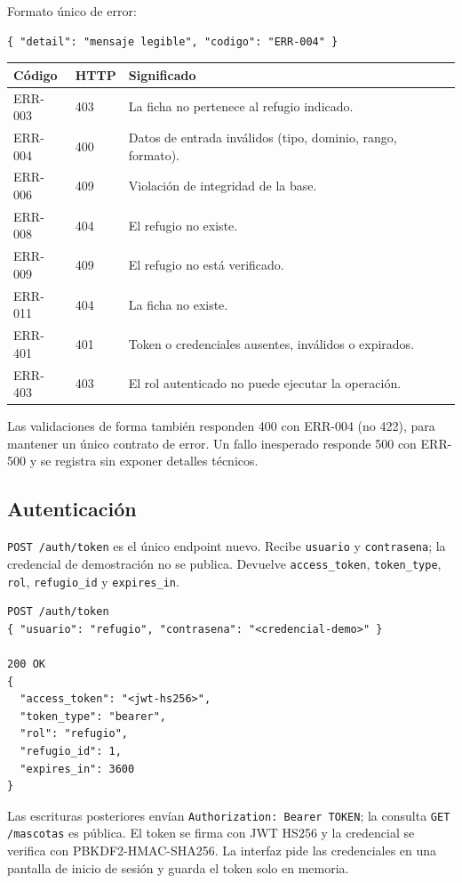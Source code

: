 \documentclass[11pt,a4paper]{article}
\newcommand{\code}[1]{\texttt{#1}}
\newcommand{\thead}[1]{\textbf{#1}}
\begin{document}
Formato único de error:

\begin{lstlisting}
{ "detail": "mensaje legible", "codigo": "ERR-004" }
\end{lstlisting}

{\footnotesize
\begin{tabularx}{\linewidth}{@{}V{0.5}V{0.5}V{2.0}@{}}
\toprule
\thead{Código} & \thead{HTTP} & \thead{Significado} \\ \midrule
ERR-003 & 403 & La ficha no pertenece al refugio indicado. \\
ERR-004 & 400 & Datos de entrada inválidos (tipo, dominio, rango, formato). \\
ERR-006 & 409 & Violación de integridad de la base. \\
ERR-008 & 404 & El refugio no existe. \\
ERR-009 & 409 & El refugio no está verificado. \\
ERR-011 & 404 & La ficha no existe. \\
ERR-401 & 401 & Token o credenciales ausentes, inválidos o expirados. \\
ERR-403 & 403 & El rol autenticado no puede ejecutar la operación. \\
\bottomrule
\end{tabularx}
}

Las validaciones de forma también responden 400 con ERR-004 (no 422), para
mantener un único contrato de error. Un fallo inesperado responde 500 con
ERR-500 y se registra sin exponer detalles técnicos.

\subsection{Autenticación}

\code{POST /auth/token} es el único endpoint nuevo. Recibe \code{usuario} y
\code{contrasena}; la credencial de demostración no se publica. Devuelve
\code{access\_token}, \code{token\_type}, \code{rol},
\code{refugio\_id} y \code{expires\_in}.

\begin{lstlisting}
POST /auth/token
{ "usuario": "refugio", "contrasena": "<credencial-demo>" }

200 OK
{
  "access_token": "<jwt-hs256>",
  "token_type": "bearer",
  "rol": "refugio",
  "refugio_id": 1,
  "expires_in": 3600
}
\end{lstlisting}

Las escrituras posteriores envían \code{Authorization: Bearer TOKEN}; la
consulta \code{GET /mascotas} es pública. El token se firma con JWT HS256 y la
credencial se verifica con PBKDF2-HMAC-SHA256. La interfaz pide las credenciales
en una pantalla de inicio de sesión y guarda el token solo en memoria.
\end{document}
